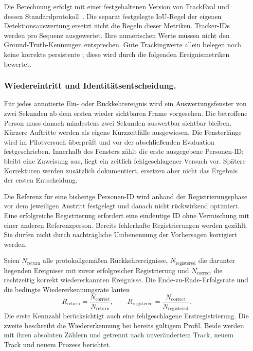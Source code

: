 \documentclass[runningheads]{llncs}
\begin{document}
Die Berechnung erfolgt mit einer festgehaltenen Version von TrackEval und dessen Standardprotokoll~\cite{trackeval}. Die separat festgelegte IoU-Regel der eigenen Detektionsauswertung ersetzt nicht die Regeln dieser Metriken. Tracker-IDs werden pro Sequenz ausgewertet. Ihre numerischen Werte müssen nicht den Ground-Truth-Kennungen entsprechen. Gute Trackingwerte allein belegen noch keine korrekte persistente ; diese wird durch die folgenden Ereignismetriken bewertet.

\subsubsection{Wiedereintritt und Identitätsentscheidung.}
Für jedes annotierte Ein- oder Rückkehrereignis wird ein Auswertungsfenster von zwei Sekunden ab dem ersten wieder sichtbaren Frame vorgesehen. Die betroffene Person muss danach mindestens zwei Sekunden auswertbar sichtbar bleiben. Kürzere Auftritte werden als eigene Kurzzeitfälle ausgewiesen. Die Fensterlänge wird im Pilotversuch überprüft und vor der abschließenden Evaluation festgeschrieben. Innerhalb des Fensters zählt die erste ausgegebene Personen-ID; bleibt eine Zuweisung aus, liegt ein zeitlich fehlgeschlagener Versuch vor. Spätere Korrekturen werden zusätzlich dokumentiert, ersetzen aber nicht das Ergebnis der ersten Entscheidung.

Die Referenz für eine bisherige Personen-ID wird anhand der Registrierungsphase vor dem jeweiligen Austritt festgelegt und danach nicht rückwirkend optimiert. Eine erfolgreiche Registrierung erfordert eine eindeutige ID ohne Vermischung mit einer anderen Referenzperson. Bereits fehlerhafte Registrierungen werden gezählt. Sie dürfen nicht durch nachträgliche Umbenennung der Vorhersagen korrigiert werden.

Seien $N_{\mathrm{return}}$ alle protokollgemäßen Rückkehrereignisse, $N_{\mathrm{registered}}$ die darunter liegenden Ereignisse mit zuvor erfolgreicher Registrierung und $N_{\mathrm{correct}}$ die rechtzeitig korrekt wiedererkannten Ereignisse. Die Ende-zu-Ende-Erfolgsrate und die bedingte Wiedererkennungsrate lauten
\begin{equation}
R_{\mathrm{return}}=
\frac{N_{\mathrm{correct}}}{N_{\mathrm{return}}},
\qquad
R_{\mathrm{registered}}=
\frac{N_{\mathrm{correct}}}{N_{\mathrm{registered}}}.
\label{eq:eval-reentry}
\end{equation}
Die erste Kennzahl berücksichtigt auch eine fehlgeschlagene Erstregistrierung. Die zweite beschreibt die Wiedererkennung bei bereits gültigem Profil. Beide werden mit ihren absoluten Zählern und getrennt nach unverändertem Track, neuem Track und neuem Prozess berichtet.
\end{document}
